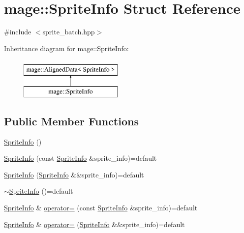 \hypertarget{structmage_1_1_sprite_info}{}\section{mage\+:\+:Sprite\+Info Struct Reference}
\label{structmage_1_1_sprite_info}


{\ttfamily \#include $<$sprite\+\_\+batch.\+hpp$>$}

Inheritance diagram for mage\+:\+:Sprite\+Info\+:\begin{figure}[H]
\begin{center}
\leavevmode
\includegraphics[height=2.000000cm]{structmage_1_1_sprite_info}
\end{center}
\end{figure}
\subsection*{Public Member Functions}
\begin{DoxyCompactItemize}
\item 
\hyperlink{structmage_1_1_sprite_info_a95544c5b70d30b273a482139c4299be0}{Sprite\+Info} ()
\item 
\hyperlink{structmage_1_1_sprite_info_a42bf55280335f8bc91b614145f766f51}{Sprite\+Info} (const \hyperlink{structmage_1_1_sprite_info}{Sprite\+Info} \&sprite\+\_\+info)=default
\item 
\hyperlink{structmage_1_1_sprite_info_ab1aaf7a0a3f3723b0836dd6e9ec6bc3e}{Sprite\+Info} (\hyperlink{structmage_1_1_sprite_info}{Sprite\+Info} \&\&sprite\+\_\+info)=default
\item 
\hyperlink{structmage_1_1_sprite_info_a17d9161b88c7f920419ae9aaf8c11299}{$\sim$\+Sprite\+Info} ()=default
\item 
\hyperlink{structmage_1_1_sprite_info}{Sprite\+Info} \& \hyperlink{structmage_1_1_sprite_info_a843c253e10ec7fd90412b5adb6ccc17f}{operator=} (const \hyperlink{structmage_1_1_sprite_info}{Sprite\+Info} \&sprite\+\_\+info)=default
\item 
\hyperlink{structmage_1_1_sprite_info}{Sprite\+Info} \& \hyperlink{structmage_1_1_sprite_info_ae504d8d63f6cabd0f9c9c28833bb9366}{operator=} (\hyperlink{structmage_1_1_sprite_info}{Sprite\+Info} \&\&sprite\+\_\+info)=default
\end{DoxyCompactItemize}
